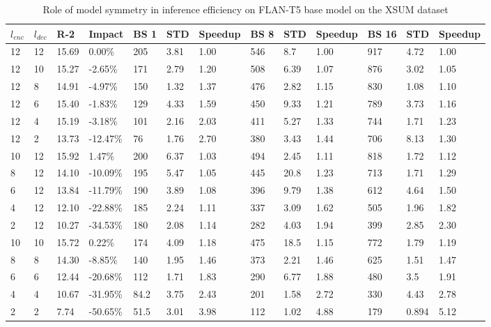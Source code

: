 \begin{table*}[!ht]
    \centering
    \caption{Role of model symmetry in inference efficiency on FLAN-T5 base model on the XSUM dataset}
    \small
    \begin{tabular}{|l|l|l|l|l|l|l|l|l|l|l|l|l|}
    \hline
         $l_{enc}$ & $l_{dec}$ & R-2 & Impact & BS 1 & STD & Speedup & BS 8 & STD  & Speedup & BS 16 & STD & Speedup\\ \hline
         12 & 12 & 15.69 & 0.00\% & 205 & 3.81 & 1.00 & 546 & 8.7 & 1.00 & 917 & 4.72 & 1.00 \\ \hline
        12 & 10 & 15.27 & -2.65\% & 171 & 2.79 & 1.20 & 508 & 6.39 & 1.07 & 876 & 3.02 & 1.05 \\ \hline
        12 & 8 & 14.91 & -4.97\% & 150 & 1.32 & 1.37 & 476 & 2.82 & 1.15 & 830 & 1.08 & 1.10 \\ \hline
        12 & 6 & 15.40 & -1.83\% & 129 & 4.33 & 1.59 & 450 & 9.33 & 1.21 & 789 & 3.73 & 1.16 \\ \hline
        12 & 4 & 15.19 & -3.18\% & 101 & 2.16 & 2.03 & 411 & 5.27 & 1.33 & 744 & 1.71 & 1.23 \\ \hline
        12 & 2 & 13.73 & -12.47\% & 76 & 1.76 & 2.70 & 380 & 3.43 & 1.44 & 706 & 8.13 & 1.30 \\ \hline
        10 & 12 & 15.92 & 1.47\% & 200 & 6.37 & 1.03 & 494 & 2.45 & 1.11 & 818 & 1.72 & 1.12 \\ \hline
        8 & 12 & 14.10 & -10.09\% & 195 & 5.47 & 1.05 & 445 & 20.8 & 1.23 & 713 & 1.71 & 1.29 \\ \hline
        6 & 12 & 13.84 & -11.79\% & 190 & 3.89 & 1.08 & 396 & 9.79 & 1.38 & 612 & 4.64 & 1.50 \\ \hline
        4 & 12 & 12.10 & -22.88\% & 185 & 2.24 & 1.11 & 337 & 3.09 & 1.62 & 505 & 1.96 & 1.82 \\ \hline
        2 & 12 & 10.27 & -34.53\% & 180 & 2.08 & 1.14 & 282 & 4.03 & 1.94 & 399 & 2.85 & 2.30 \\ \hline
        10 & 10 & 15.72 & 0.22\% & 174 & 4.09 & 1.18 & 475 & 18.5 & 1.15 & 772 & 1.79 & 1.19 \\ \hline
        8 & 8 & 14.30 & -8.85\% & 140 & 1.95 & 1.46 & 373 & 2.21 & 1.46 & 625 & 1.51 & 1.47 \\ \hline
        6 & 6 & 12.44 & -20.68\% & 112 & 1.71 & 1.83 & 290 & 6.77 & 1.88 & 480 & 3.5 & 1.91 \\ \hline
        4 & 4 & 10.67 & -31.95\% & 84.2 & 3.75 & 2.43 & 201 & 1.58 & 2.72 & 330 & 4.43 & 2.78 \\ \hline
        2 & 2 & 7.74 & -50.65\% & 51.5 & 3.01 & 3.98 & 112 & 1.02 & 4.88 & 179 & 0.894 & 5.12 \\ \hline
    \end{tabular}
    \label{tab:xswum-asym-inference-base}
\end{table*}

